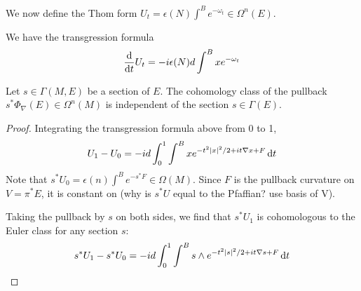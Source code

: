 We now define the Thom form $U_t = \epsilon(N) \int^B e^{-\omega_t} \in
\Omega^n(E)$. 


\begin{comment} %
Let $E=P\times_\rho V$ be the associated bundle to $P$ with rank $2m$. 
basic forms on $P\times V$ are in correspondence with forms on  $E$.

A representative for the Thom class, called the Mathai-Quillen Thom form, is
given by
\begin{equation} \label{eq:mathai_quillen}
\Phi_\nabla(E) = \frac{1}{(2\pi)^m} e^{-v_a^2/2} \int \odif{\chi} 
\exp(\chi_a\Omega^{ab}\chi_b /2 + i\nabla v^a \chi_a)
\end{equation}
where $v^a \in \Omega^0(P\times V)$ are coordinates on $V$, and $\nabla v^a \in
\Omega^1(P\times V)$ is the exterior covariant derivative of $v^a$.
Not well defined globally, since using trivialisation to use coordinates? 

We claim that this defines a basic form in $\Omega^{2m}_\rho(P\times V)$,
and that it is a representative of the Thom class. 

To show that it is a basic form, we need to prove it is horizontal and $\rho$
equivariant.  

To show that is is a representative of the Thom class, we need to prove it is
closed and satisfies  $\pi^*\Phi_\nabla(E) = 1$.

Pullback by zero section is Pfaffian.
\end{comment} 

\begin{prop} %
	We have the transgression formula
	\[
	\odv{}{t} U_t = -i\epsilon(N) d\int^B x e^{-\omega_t}
	\] 
\end{prop}
\begin{prop} \label{prop:thom_pullback}
	Let $s\in \Gamma(M,E)$ be a section of $E$.
	The cohomology class of the pullback $s^*\Phi_\nabla(E) \in \Omega^{n}(M)$
	is independent of the section  $s\in\Gamma(E)$.
\end{prop}
\begin{proof}
	Integrating the transgression formula above from 0 to 1, 
	\[
		U_1 - U_0 = -id\int_0^1\int^B x e^{-t^2\abs{x}^2/2 +
		it\nabla x + F} \odif{t}
	\] 
	Note that $s^*U_0 = \epsilon(n)\int^B e^{-s^*F} \in \Omega(M)$. Since $F$ is
	the pullback curvature on $V = \pi^*E$, it is constant on 
	(why is $s^*U$ equal to the Pfaffian? use basis of V).

	Taking the pullback by $s$ on both sides, we find that $s^*U_1$ is
	cohomologous to the Euler class for any section $s$:  
	\[
		s^*U_1 - s^*U_0 = -id\int_0^1\int^B s\wedge e^{-t^2\abs{s}^2/2 +
		it\nabla s + F} \odif{t}
	\] 
\end{proof}
